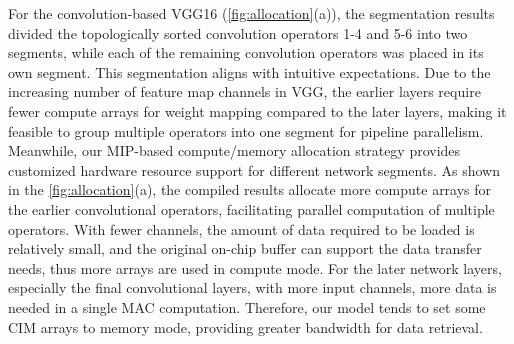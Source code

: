 For the convolution-based VGG16 (\fig \ref{fig:allocation}(a)), the segmentation results divided the topologically sorted convolution operators 1-4 and 5-6 into two segments, while each of the remaining convolution operators was placed in its own segment. This segmentation aligns with intuitive expectations.
Due to the increasing number of feature map channels in VGG, 
the earlier layers require fewer compute arrays for weight mapping compared to the later layers, making it feasible to group multiple operators into one segment for pipeline parallelism.
Meanwhile, our MIP-based compute/memory allocation strategy provides customized hardware resource support for different network segments. 
As shown in the \fig \ref{fig:allocation}(a), the compiled results allocate more compute arrays for the earlier convolutional operators,
facilitating parallel computation of multiple operators.
With fewer channels, the amount of data required to be loaded is relatively small, and the original on-chip buffer can support the data transfer needs, thus more arrays are used in compute mode.
For the later network layers, especially the final convolutional layers, with more input channels, 
more data is needed in a single MAC computation. Therefore, our model tends to set some CIM arrays to memory mode, providing greater bandwidth for data retrieval.

